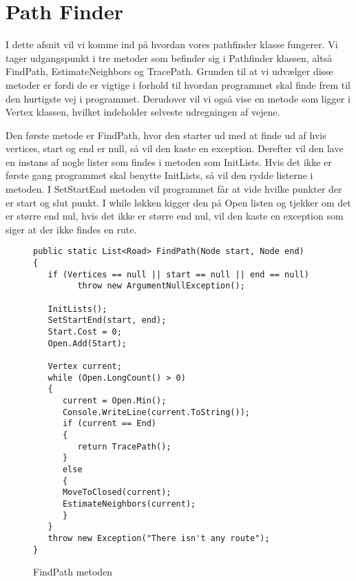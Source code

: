 \section{Path Finder}\label{PathFinder}
I dette afsnit vil vi komme ind på hvordan vores pathfinder klasse fungerer. Vi tager udgangspunkt i tre metoder som befinder sig i Pathfinder klassen, altså FindPath, EstimateNeighbors og TracePath. Grunden til at vi udvælger disse metoder er fordi de er vigtige i forhold til hvordan programmet skal finde frem til den hurtigste vej i programmet. Derudover vil vi også vise en metode som ligger i Vertex klassen, hvilket indeholder selveste udregningen af vejene. 

\vspace{5mm}

Den første metode er FindPath, hvor den starter ud med at finde ud af hvis vertices, start og end er null, så vil den kaste en exception. Derefter vil den lave en instans af nogle lister som findes i metoden som InitLists. Hvis det ikke er første gang programmet skal benytte InitLists, så vil den rydde listerne i metoden. I SetStartEnd metoden vil programmet får at vide hvilke punkter der er start og slut punkt. I while løkken kigger den på Open listen og tjekker om det er større end nul, hvis det ikke er større end nul, vil den kaste en exception som siger at der ikke findes en rute.

\begin{figure}[H]
\begin{lstlisting}
public static List<Road> FindPath(Node start, Node end)
{
   if (Vertices == null || start == null || end == null)
         throw new ArgumentNullException();

   InitLists();
   SetStartEnd(start, end);
   Start.Cost = 0;
   Open.Add(Start);

   Vertex current;
   while (Open.LongCount() > 0)
   {
      current = Open.Min();
      Console.WriteLine(current.ToString());
      if (current == End)
      {
         return TracePath();
      } 
      else
      {
      MoveToClosed(current);
      EstimateNeighbors(current);
      }
   }
   throw new Exception("There isn't any route");
}
\end{lstlisting}
\caption{FindPath metoden}\label{FindPathCode}
\end{figure}

\vspace{5mm}

